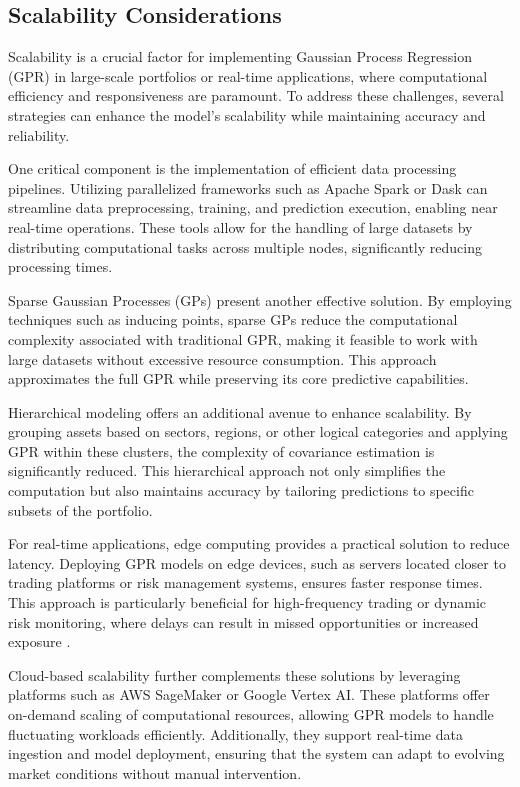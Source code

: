 \subsection{Scalability Considerations}
Scalability is a crucial factor for implementing Gaussian Process Regression (GPR) in large-scale portfolios or real-time applications, where computational efficiency and responsiveness are paramount. To address these challenges, several strategies can enhance the model's scalability while maintaining accuracy and reliability.

One critical component is the implementation of efficient data processing pipelines. Utilizing parallelized frameworks such as Apache Spark or Dask can streamline data preprocessing, training, and prediction execution, enabling near real-time operations. These tools allow for the handling of large datasets by distributing computational tasks across multiple nodes, significantly reducing processing times.

Sparse Gaussian Processes (GPs) present another effective solution. By employing techniques such as inducing points, sparse GPs reduce the computational complexity associated with traditional GPR, making it feasible to work with large datasets without excessive resource consumption. This approach approximates the full GPR while preserving its core predictive capabilities.

Hierarchical modeling offers an additional avenue to enhance scalability. By grouping assets based on sectors, regions, or other logical categories and applying GPR within these clusters, the complexity of covariance estimation is significantly reduced. This hierarchical approach not only simplifies the computation but also maintains accuracy by tailoring predictions to specific subsets of the portfolio.

For real-time applications, edge computing provides a practical solution to reduce latency. Deploying GPR models on edge devices, such as servers located closer to trading platforms or risk management systems, ensures faster response times. This approach is particularly beneficial for high-frequency trading or dynamic risk monitoring, where delays can result in missed opportunities or increased exposure \cite{Doe2021}.

Cloud-based scalability further complements these solutions by leveraging platforms such as AWS SageMaker or Google Vertex AI. These platforms offer on-demand scaling of computational resources, allowing GPR models to handle fluctuating workloads efficiently. Additionally, they support real-time data ingestion and model deployment, ensuring that the system can adapt to evolving market conditions without manual intervention.

